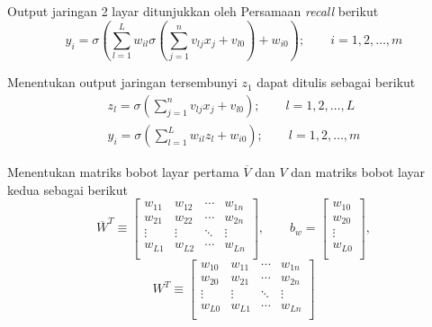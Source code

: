 \noindent Output jaringan 2 layar ditunjukkan oleh Persamaan \textit{recall} berikut
\begin{equation} \label{eq:3:2layerOut}
y_i = \sigma
\left(
\sum_{l=1}^{L}w_{il}\sigma
	\left(
		\sum_{j=1}^{n}v_{lj}x_j + v_{l0}
	\right)
	+ w_{i0}
\right); \qquad i = 1,2,\dots,m
\end{equation}

\noindent Menentukan output jaringan tersembunyi $z_1$ dapat ditulis sebagai berikut
\begin{equation} \label{eq:3:hiddenlayer}
\begin{split}
z_l = \sigma\left(\sum_{j=1}^{n}v_{lj}x_j+v_{l0} \right);\qquad l = 1,2,\dots,L\\
y_i = \sigma\left(\sum_{l=1}^{L}w_{il}z_l+w_{i0} \right);\qquad l = 1,2,\dots,m
\end{split}
\end{equation}

\noindent Menentukan matriks bobot layar pertama $\overline{V}$ dan $V$ dan matriks bobot layar kedua sebagai berikut
\begin{equation} \label{eq:3:weight21Vector}
\overline{W}^T \equiv
\left[
\begin{matrix}
w_{11} & w_{12} & \cdots & w_{1n} \\
w_{21} & w_{22} & \cdots & w_{2n} \\
\vdots & \vdots & \ddots & \vdots \\
w_{L1} & w_{L2} & \cdots & w_{Ln} \\
\end{matrix}
\right], \qquad
b_w = 
\left[
\begin{matrix}
w_{10} \\
w_{20} \\
\vdots \\
w_{L0} \\
\end{matrix}
\right],
\end{equation}
\begin{equation} \label{eq:3:weight22Vector}
W^T \equiv
\left[
\begin{matrix}
w_{10} & w_{11} & \cdots & w_{1n} \\
w_{20} & w_{21} & \cdots & w_{2n} \\
\vdots & \vdots & \ddots & \vdots \\
w_{L0} & w_{L1} & \cdots & w_{Ln} \\
\end{matrix}
\right]
\end{equation}

